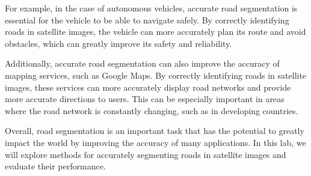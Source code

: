 \documentclass[10pt,conference,compsocconf]{IEEEtran}
\begin{document}
For example, in the case of autonomous vehicles, accurate road segmentation is essential for the vehicle to be able to navigate safely. By correctly identifying roads in satellite images, the vehicle can more accurately plan its route and avoid obstacles, which can greatly improve its safety and reliability.

Additionally, accurate road segmentation can also improve the accuracy of mapping services, such as Google Maps. By correctly identifying roads in satellite images, these services can more accurately display road networks and provide more accurate directions to users. This can be especially important in areas where the road network is constantly changing, such as in developing countries.

Overall, road segmentation is an important task that has the potential to greatly impact the world by improving the accuracy of many applications. In this lab, we will explore methods for accurately segmenting roads in satellite images and evaluate their performance.



\end{document}
